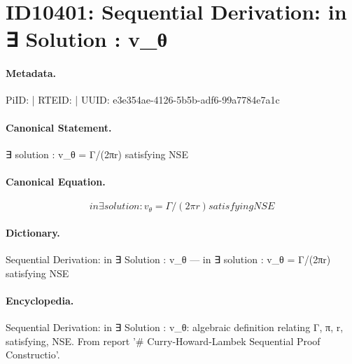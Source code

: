 \section*{ID10401: Sequential Derivation: in ∃ Solution : v\_θ}
\paragraph{Metadata.}
PiID:  | RTEID:  | UUID: e3e354ae-4126-5b5b-adf6-99a7784e7a1c

\paragraph{Canonical Statement.}
∃ solution : v\_θ = Γ/(2πr) satisfying NSE

\paragraph{Canonical Equation.}
\[
in ∃ solution : v_θ = Γ/(2πr) satisfying NSE
\]

\paragraph{Dictionary.}
Sequential Derivation: in ∃ Solution : v\_θ — in ∃ solution : v\_θ = Γ/(2πr) satisfying NSE

\paragraph{Encyclopedia.}
Sequential Derivation: in ∃ Solution : v\_θ: algebraic definition relating Γ, π, r, satisfying, NSE. From report '\# Curry-Howard-Lambek Sequential Proof Constructio'.
